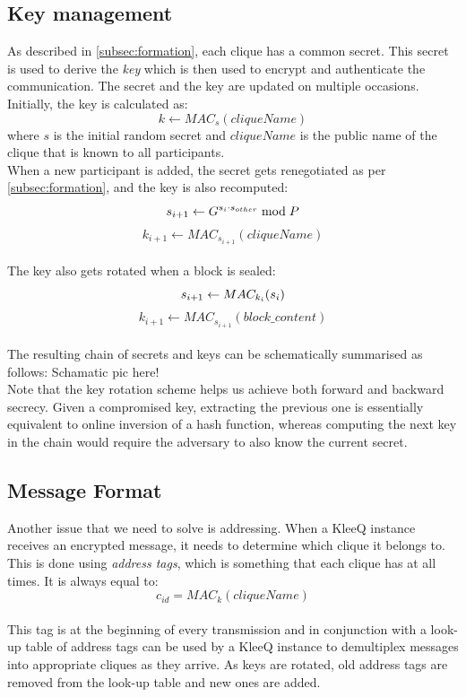\documentclass[a4paper, 12pt]{report}
\begin{document}
\subsection{Key management}
\label{subsec:prep.keyman}
As described in \cref{subsec:formation}, each clique has a common secret. This secret is used to derive the \emph{key} which is then used to encrypt and authenticate the communication. The secret and the key are updated on multiple occasions. Initially, the key is calculated as:
\begin{equation*}
    k \leftarrow MAC_{s}(cliqueName)
\end{equation*}
where $s$ is the initial random secret and $cliqueName$ is the public name of the clique that is known to all participants. \\ 

When a new participant is added, the secret gets renegotiated as per \cref{subsec:formation}, and the key is also recomputed: \\
\[
    s_{i+1} \leftarrow G^{s_i \cdot s_{other}} \bmod P  \\ 
\]
\[
    k_{i+1} \leftarrow MAC_{s_{i+1}}(cliqueName)
\] \\


The key also gets rotated when a block is sealed:
\[
    s_{i+1} \leftarrow MAC_{k_i}(s_i) \\ 
\]
\[
    k_{i+1} \leftarrow MAC_{s_{i+1}}(block\_content)
\] \\

The resulting chain of secrets and keys can be schematically summarised as follows:
{ 
    {\color{red} Schamatic pic here!}
} \\ 
Note that the key rotation scheme helps us achieve both forward and backward secrecy. Given a compromised key, extracting the previous one is essentially equivalent to online inversion of a hash function, whereas computing the next key in the chain would require the adversary to also know the current secret.


\subsection{Message Format}
\label{ssec:prep.proto.msg_fmt}
Another issue that we need to solve is addressing. When a KleeQ instance receives an encrypted message, it needs to determine which clique it belongs to. This is done using \emph{address tags}, which is something that each clique has at all times. It is always equal to:
\begin{equation*}
    c_{id} = MAC_{k}(cliqueName)
\end{equation*} \\
This tag is at the beginning of every transmission and in conjunction with a look-up table of address tags can be used by a KleeQ instance to demultiplex messages into appropriate cliques as they arrive. As keys are rotated, old address tags are removed from the look-up table and new ones are added.\\
\end{document}

